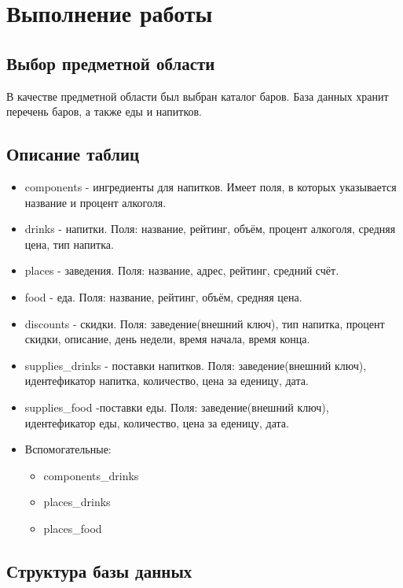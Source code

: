 \section{Выполнение работы}


\subsection{Выбор предметной области}

В качестве предметной области был выбран каталог баров. База данных хранит перечень баров, а также еды и напитков.

\subsection{Описание таблиц}
\begin{itemize}
	\item components - ингредиенты для напитков. Имеет поля, в которых указывается название и процент алкоголя.
	\item drinks - напитки. Поля: название, рейтинг, объём, процент алкоголя, средняя цена, тип напитка.
	\item places - заведения. Поля: название, адрес, рейтинг, средний счёт.
	\item food - еда. Поля: название, рейтинг, объём, средняя цена.
	\item discounts - скидки. Поля: заведение(внешний ключ), тип напитка, процент скидки, описание, день недели, время начала, время конца.
	\item supplies\_drinks - поставки напитков. Поля: заведение(внешний ключ), идентефикатор напитка, количество, цена за еденицу, дата.
	\item supplies\_food -поставки еды. Поля: заведение(внешний ключ), идентефикатор еды, количество, цена за еденицу, дата.
	\item Вспомогательные: 
		\begin {itemize}
		\item components\_drinks
		\item places\_drinks
		\item places\_food
	\end {itemize}
\end{itemize}


\subsection{Структура базы данных}


